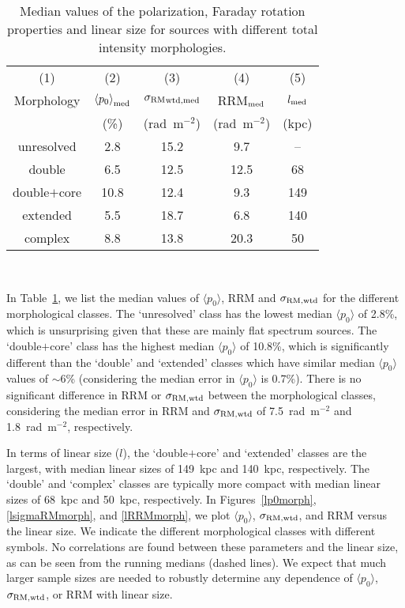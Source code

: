 \documentclass{mnras}
\newcommand*\sigmaRM{\sigma_{\rm RM}}
\newcommand*\sigmaRMwtd{\sigma_{\rm RM, wtd}}
\begin{document}
\begin{table}%
 \caption{Median values of the polarization, Faraday rotation properties and linear size for 
sources with different total intensity morphologies.}
 \centering
   \begin{tabular}{ccccc}
    \hline\hline
       (1) & (2) & (3) & (4) & (5)  \\
      Morphology   & ${\langle p_0 \rangle}_{\rm med}$         & ${\sigmaRM}_{\rm wtd, med}$       &     RRM$_{\rm med}$       & $l_{\rm med}$    \\
                            &                (\%)                                         &         (rad~m$^{-2}$)                        &         (rad~m$^{-2}$)       &         (kpc) \\
      \hline            
unresolved          & 2.8    & 15.2  & 9.7      & --      \\
double                 & 6.5    & 12.5  & 12.5   & 68    \\
double$+$core    & 10.8  & 12.4  & 9.3      &  149  \\
extended             & 5.5    & 18.7  & 6.8      & 140      \\
complex              & 8.8    & 13.8   & 20.3   & 50       \\
\hline
   \end{tabular}\\
\label{morphmeds}
\end{table}


In Table~\ref{morphmeds}, we list the median values of $\langle p_0 \rangle$, RRM and $\sigmaRMwtd$ for the different morphological classes. 
The `unresolved' class has the lowest median $\langle p_0\rangle$ of 2.8\%, which is unsurprising given that these are mainly flat spectrum sources. 
The `double$+$core' class has the highest median $\langle p_0\rangle$ of 10.8\%, which is significantly different than the `double' and `extended' classes which have similar median $\langle p_0\rangle$ values of $\sim$6\% (considering the median error in $\langle p_0\rangle$ is 0.7\%). 
There is no significant difference in RRM or $\sigmaRMwtd$ between the morphological classes, considering the median error in RRM and $\sigmaRMwtd$ of 7.5~rad~m$^{-2}$ and 1.8~rad~m$^{-2}$, respectively.  

In terms of linear size ($l$), the `double$+$core' and `extended' classes are the largest, with median linear sizes of 149~kpc and 140~kpc, respectively. 
The `double' and `complex' classes are typically more compact with median linear sizes of 68~kpc and 50~kpc, respectively. 
In Figures~\ref{lp0morph}, \ref{lsigmaRMmorph}, and \ref{lRRMmorph}, we plot $\langle p_0\rangle$, $\sigmaRMwtd$, and RRM versus the linear size. We indicate the different morphological classes with different symbols. No correlations are found between these parameters and the linear size, as can be seen from the running medians (dashed lines). We expect that much larger sample sizes are needed to robustly determine any dependence of $\langle p_0\rangle$, $\sigmaRMwtd$, or RRM with linear size. 
\end{document}
